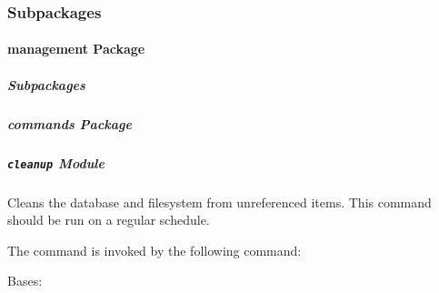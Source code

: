 \documentclass[letterpaper,10pt,english]{sphinxmanual}
\begin{document}
\subsubsection{Subpackages}
\label{Contour.contour:subpackages}

\paragraph{management Package}
\label{Contour.contour.management:management-package}\label{Contour.contour.management::doc}

\subparagraph{Subpackages}
\label{Contour.contour.management:subpackages}

\subparagraph{commands Package}
\label{Contour.contour.management.commands::doc}\label{Contour.contour.management.commands:commands-package}

\subparagraph{\texttt{cleanup} Module}
\label{Contour.contour.management.commands:module-Contour.contour.management.commands.cleanup}\label{Contour.contour.management.commands:cleanup-module}
Cleans the database and filesystem from unreferenced items. This command should be run on a regular schedule.

The command is invoked by the following command: 

\begin{fulllineitems}
\label{Contour.contour.management.commands:Contour.contour.management.commands.cleanup.Command}
Bases: 

\begin{fulllineitems}
\label{Contour.contour.management.commands:Contour.contour.management.commands.cleanup.Command.handle}
\end{fulllineitems}


\begin{fulllineitems}
\label{Contour.contour.management.commands:Contour.contour.management.commands.cleanup.Command.help}
\end{fulllineitems}


\end{fulllineitems}
\end{document}
